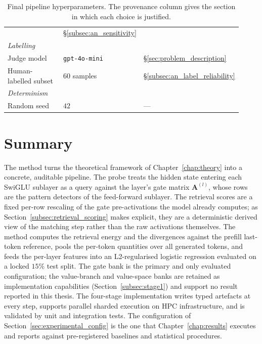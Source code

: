 \begin{table}[H]
\begin{tabular}{p{0.36\linewidth} p{0.28\linewidth} p{0.28\linewidth}}
            & \S\ref{subsec:an_sensitivity} \\
        \multicolumn{3}{l}{\emph{Labelling}} \\
        \hspace{1em}Judge model
            & \texttt{gpt-4o-mini}
            & \S\ref{sec:problem_description} \\
        \hspace{1em}Human-labelled subset
            & $60$ samples
            & \S\ref{subsec:an_label_reliability} \\
        \multicolumn{3}{l}{\emph{Determinism}} \\
        \hspace{1em}Random seed
            & $42$
            & --- \\
        \bottomrule
    \end{tabular}
    \caption{Final pipeline hyperparameters. The provenance column gives
    the section in which each choice is justified.}
    \label{tab:hyperparameters}
\end{table}

\section{Summary}
\label{sec:method_summary}

The method turns the theoretical framework of Chapter~\ref{chap:theory} into a
concrete, auditable pipeline. The probe treats the hidden state entering each
SwiGLU sublayer as a query against the layer's gate matrix $\mathbf{A}^{(l)}$,
whose rows are the pattern detectors of the feed-forward sublayer. The
retrieval scores are a fixed per-row rescaling of the gate pre-activations the
model already computes; as Section~\ref{subsec:retrieval_scoring} makes
explicit, they are a deterministic derived view of the matching step rather
than the raw activations themselves. The method computes the retrieval energy
and the divergences against the prefill last-token reference, pools the
per-token quantities over all generated tokens, and feeds the per-layer
features into an L2-regularised logistic regression evaluated on a locked
$15\%$ test split. The gate bank is the primary and only evaluated
configuration; the value-branch and value-space banks are retained as
implementation capabilities (Section~\ref{subsec:stage1}) and support no
result reported in this thesis. The four-stage implementation writes typed
artefacts at every step, supports parallel sharded execution on HPC
infrastructure, and is validated by unit and integration tests. The
configuration of Section~\ref{sec:experimental_config} is the one that
Chapter~\ref{chap:results} executes and reports against pre-registered
baselines and statistical procedures.